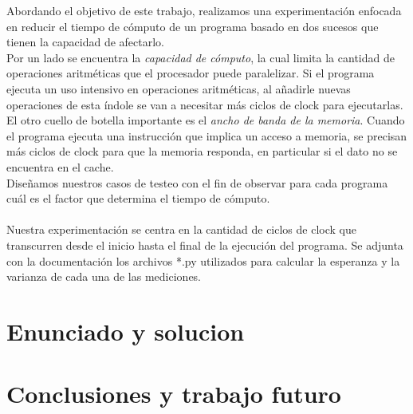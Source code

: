 \documentclass[a4paper]{article}
\begin{document}
Abordando el objetivo de este trabajo, realizamos una experimentaci\'on enfocada en reducir el tiempo de c\'omputo de un programa basado en dos sucesos que tienen la capacidad de afectarlo. \\
\indent Por un lado se encuentra la \textit{capacidad de c\'omputo}, la cual limita la cantidad de operaciones aritm\'eticas que el procesador puede paralelizar. Si el programa ejecuta un uso intensivo en operaciones aritm\'eticas, al añadirle nuevas operaciones de esta \'indole se van a necesitar m\'as ciclos de clock para ejecutarlas. \\
\indent El otro cuello de botella importante es el \textit{ancho de banda de la memoria}. Cuando el programa ejecuta una instrucci\'on que implica un acceso a memoria, se precisan m\'as ciclos de clock para que la memoria responda, en particular si el dato no se encuentra en el cache.\\
\indent Diseñamos nuestros casos de testeo con el fin de observar para cada programa cu\'al es el factor que determina el tiempo de c\'omputo.\\
\\
\indent Nuestra experimentaci\'on se centra en la cantidad de ciclos de clock que transcurren desde el inicio hasta el final de la ejecuci\'on del programa. Se adjunta con la documentaci\'on los archivos *.py utilizados para calcular la esperanza y la varianza de cada una de las mediciones.\\



%
%
%


\section{Enunciado y solucion} 



\section{Conclusiones y trabajo futuro}
\end{document}

